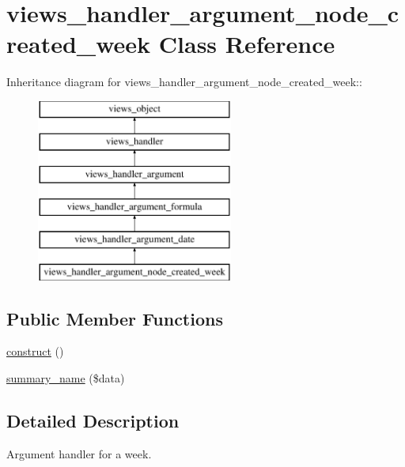 \hypertarget{classviews__handler__argument__node__created__week}{
\section{views\_\-handler\_\-argument\_\-node\_\-created\_\-week Class Reference}
\label{classviews__handler__argument__node__created__week}
}
Inheritance diagram for views\_\-handler\_\-argument\_\-node\_\-created\_\-week::\begin{figure}[H]
\begin{center}
\leavevmode
\includegraphics[height=6cm]{classviews__handler__argument__node__created__week}
\end{center}
\end{figure}
\subsection*{Public Member Functions}
\begin{CompactItemize}
\item 
\hyperlink{classviews__handler__argument__node__created__week_e90c3f8a723cfa081198075d2fe67c52}{construct} ()
\item 
\hyperlink{classviews__handler__argument__node__created__week_12d7be7da978ed5571bb28a17b6b2805}{summary\_\-name} (\$data)
\end{CompactItemize}


\subsection{Detailed Description}
Argument handler for a week. 


